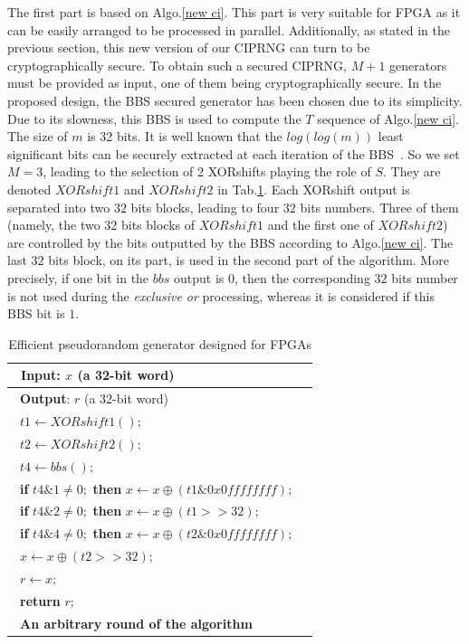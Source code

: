 The first part is based on Algo.\ref{new ci}.
This part is very suitable for FPGA as it can be easily 
arranged to be processed in parallel.
Additionally, as stated in the previous section, 
this new version of our CIPRNG can turn to be cryptographically secure.
To obtain such a secured CIPRNG,
$M + 1$ generators must be provided as input, one of them being
cryptographically secure.
In the proposed design, the BBS secured generator has been chosen 
due to its simplicity. 
Due to its slowness, this BBS is used to compute the $T$ sequence of Algo.\ref{new ci}.
The size of $m$ is 32 bits. 
It is well known that the $log(log(m))$ least significant bits 
can be securely extracted at each iteration of the BBS~\cite{vmd}.
So we set $M = 3$, leading to the selection of 2 XORshifts 
playing the role of $S$. They are denoted $XORshift1$ and $XORshift2$ 
in Tab.\ref{fpga ci}. 
Each XORshift output is separated into two $32$ bits blocks, leading to 
four $32$ bits numbers. 
Three of them (namely, the two $32$ bits blocks of $XORshift1$ 
and the first one of $XORshift2$) are controlled by the bits outputted
by the BBS according to Algo.\ref{new ci}.
The last $32$ bits block, on its part, is used in the second part of the algorithm.
More precisely, if one bit in the $bbs$ output is $0$, then the corresponding 
$32$ bits number is not used during the \emph{exclusive or} processing, 
whereas it is considered if this BBS bit is $1$.

\begin{table}
\caption{Efficient pseudorandom generator designed for FPGAs}
\centering
\begin{tabular}{|l|l|}
\hline
~\textbf{Input}: $x$ (a 32-bit word)\\
\hline
~\textbf{Output}: $r$ (a 32-bit word)\\
\hline
~$t1 \leftarrow XORshift1();$\\
~$t2 \leftarrow XORshift2();$\\
~$t4 \leftarrow bbs();$\\
~\textbf{if} $t4 \& 1 \neq 0;$ \textbf{then} $x \leftarrow x \oplus (t1 \& 0x0ffffffff);$\\
~\textbf{if} $t4 \& 2 \neq 0;$ \textbf{then} $x \leftarrow x \oplus (t1 >> 32);$\\
~\textbf{if} $t4 \& 4 \neq 0;$ \textbf{then} $x \leftarrow x \oplus (t2 \& 0x0ffffffff);$\\
~$x \leftarrow x \oplus (t2 >> 32);$\\
~$r \leftarrow x;$\\
~\textbf{return} $r;$\\
\hline
~\textbf{An arbitrary round of the algorithm}~\\
\hline
\end{tabular}
\label{fpga ci}
\end{table}

